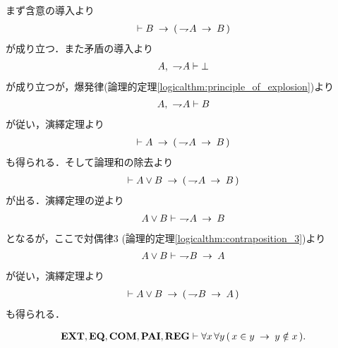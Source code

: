 	\begin{sketch}
		まず含意の導入より
		\begin{align}
			\vdash B \rarrow (\, \negation A \rarrow B\, )
		\end{align}
		が成り立つ．また矛盾の導入より
		\begin{align}
			A,\ \negation A \vdash \bot
		\end{align}
		が成り立つが，爆発律(論理的定理\ref{logicalthm:principle_of_explosion})より
		\begin{align}
			A,\ \negation A \vdash B
		\end{align}
		が従い，演繹定理より
		\begin{align}
			\vdash A \rarrow (\, \negation A \rarrow B\, )
		\end{align}
		も得られる．そして論理和の除去より
		\begin{align}
			\vdash A \vee B \rarrow (\, \negation A \rarrow B\, )
		\end{align}
		が出る．演繹定理の逆より
		\begin{align}
			A \vee B \vdash\ \negation A \rarrow B
		\end{align}
		となるが，ここで対偶律$3$ (論理的定理\ref{logicalthm:contraposition_3})より
		\begin{align}
			A \vee B \vdash\ \negation B \rarrow A
		\end{align}
		が従い，演繹定理より
		\begin{align}
			\vdash A \vee B \rarrow (\, \negation B \rarrow A\, )
		\end{align}
		も得られる．
		\QED
	\end{sketch}
	
	\begin{screen}
		\begin{thm}[集合のどの二組も所属関係で堂々巡りしない]
		\label{thm:no_pair_of_sets_go_round}
			\begin{align}
				\EXTAX,\EQAX,\COMAX,\PAIAX,\REGAX \vdash 
				\forall x\, \forall y\, (\, x \in y \rarrow y \notin x\, ).
			\end{align}
		\end{thm}
	\end{screen}
	
